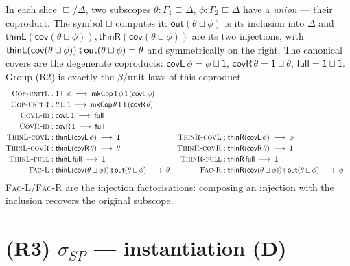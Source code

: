 \documentclass{article}
\newcommand{\thin}{\sqsubseteq}                    %
\newcommand{\oi}{\mathsf{1}}                        %
\newcommand{\comp}{\mathbin{\fatsemi}}              %
\newcommand{\thL}{\mathsf{thinL}}
\newcommand{\thR}{\mathsf{thinR}}
\newcommand{\cop}{\mathbin{\sqcup}}                 %
\newcommand{\mkcop}{\mathsf{mkCop}}
\newcommand{\out}{\mathsf{out}}
\newcommand{\cov}{\mathsf{cov}}
\newcommand{\covL}{\mathsf{covL}}
\newcommand{\covR}{\mathsf{covR}}
\newcommand{\full}{\mathsf{full}}
\newcommand{\rw}{\;\longrightarrow\;}              %
\newcommand{\catD}{\textbf{(D)}}
\theoremstyle{plain}
\begin{document}
\noindent
In each slice $\thin/\Delta$, two subscopes $\theta:\Gamma_1\thin\Delta$,
$\phi:\Gamma_2\thin\Delta$ have a \emph{union} — their coproduct.
The symbol $\cop$ computes it: $\out(\theta\cop\phi)$ is its inclusion into $\Delta$
and $\thL(\cov(\theta\cop\phi)),\thR(\cov(\theta\cop\phi))$ are its two injections, with
$\thL(\cov(\theta\cop\phi))\comp\out(\theta\cop\phi)=\theta$ and symmetrically on the right.
The canonical covers are the degenerate coproducts:
$\covL\,\phi = \phi\cop\oi$, $\covR\,\theta = \oi\cop\theta$, $\full = \oi\cop\oi$.
Group (R2) is exactly the $\beta$/unit laws of this coproduct.
\begin{align}
  \textsc{Cop-unitL} &: \oi\cop\phi \rw \mkcop\,\oi\,\phi\,\oi\,(\covL\,\phi) \label{r:copUnitL}\\
  \textsc{Cop-unitR} &: \theta\cop\oi \rw \mkcop\,\theta\,\oi\,\oi\,(\covR\,\theta) \label{r:copUnitR}\\
  \textsc{CovL-id} &: \covL\,\oi \rw \full \label{r:covLId}\\
  \textsc{CovR-id} &: \covR\,\oi \rw \full \label{r:covRId}\\
  \textsc{ThinL-covL} &: \thL(\covL\,\phi) \rw \oi
    & \textsc{ThinR-covL} &: \thR(\covL\,\phi) \rw \phi \label{r:thinCovL}\\
  \textsc{ThinL-covR} &: \thL(\covR\,\theta) \rw \theta
    & \textsc{ThinR-covR} &: \thR(\covR\,\theta) \rw \oi \label{r:thinCovR}\\
  \textsc{ThinL-full} &: \thL\,\full \rw \oi
    & \textsc{ThinR-full} &: \thR\,\full \rw \oi \label{r:thinFull}\\
  \textsc{Fac-L} &: \thL(\cov(\theta\cop\phi))\comp\out(\theta\cop\phi) \rw \theta
    & \textsc{Fac-R} &: \thR(\cov(\theta\cop\phi))\comp\out(\theta\cop\phi) \rw \phi \label{r:fac}
\end{align}
\textsc{Fac-L}/\textsc{Fac-R} are the injection factorisations: composing an injection
with the inclusion recovers the original subscope.

\section{(R3) $\sigma_{SP}$ --- instantiation \hfill \catD}\label{r:inst}
\end{document}
